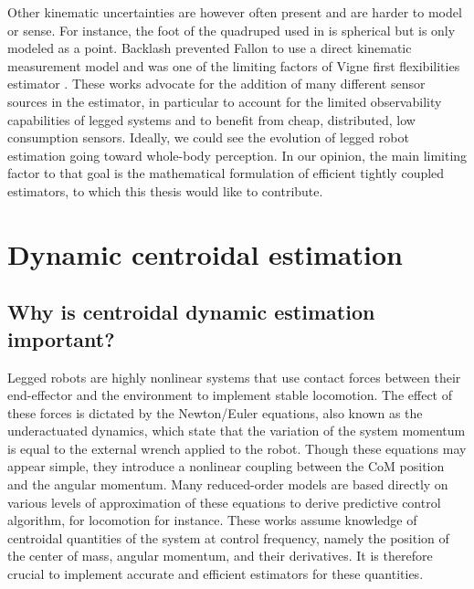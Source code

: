 Other kinematic uncertainties are however often present and are harder to model or sense. For instance, the foot of the quadruped used in 
\cite{bloesch2013state} is spherical but is only modeled as a point. Backlash prevented Fallon \cite{fallon2014drift} to use a direct kinematic 
measurement model and was one of the limiting factors of Vigne first flexibilities estimator \cite{vigne2018estimation}. 
These works advocate for the addition of many different sensor sources in the estimator, in particular to account for the limited observability
capabilities of legged systems and to benefit from cheap, distributed, low consumption sensors. Ideally, we could see the evolution of legged
robot estimation going toward whole-body perception. In our opinion, the main limiting factor to that goal is the mathematical formulation of efficient tightly
coupled estimators, to which this thesis would like to contribute.  


\section{Dynamic centroidal estimation}
%
\label{sec:centroidal_est_lit}
\subsection{Why is centroidal dynamic estimation important?}
Legged robots are highly nonlinear systems that use contact forces between their end-effector and the environment to implement stable locomotion. 
The effect of these forces is dictated by the Newton/Euler equations, also known as the underactuated dynamics, which state that the variation of the 
system momentum is equal to the external wrench applied to the robot. Though these equations may appear simple, they introduce a nonlinear coupling 
between the CoM position and the angular momentum. Many reduced-order models are based directly on 
various levels of approximation of these equations \cite{kajita20013d, wieber2006trajectory, carpentier2016versatile} to derive predictive
control algorithm, for locomotion for instance. These works assume knowledge of centroidal quantities of the system at control frequency, 
namely the position of the center of mass, angular momentum, and their derivatives. 
It is therefore crucial to implement accurate and efficient estimators for these quantities.

